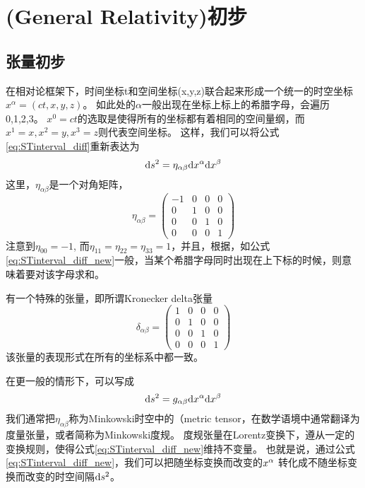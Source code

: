 \section{\GR (General Relativity)初步}
\subsection{张量初步}\label{sec:tensor}
在相对论框架下，时间坐标t和空间坐标(x,y,z)联合起来形成一个统一的时空坐标
$x^{\alpha} = (ct,x,y,z)$。
如此处的$\alpha$一般出现在坐标上标上的希腊字母，会遍历{0,1,2,3}。
$x^0= ct$的选取是使得所有的坐标都有着相同的空间量纲，而$x^1 =x, x^2 = y, x^3 = z$则代表空间坐标。
这样，我们可以将公式\ref{eq:STinterval_diff}重新表达为
\begin{equation}\label{eq:STinterval_diff_new}
  {\rm d}s^2 = \eta_ {\alpha \beta}{\rm d}x^\alpha {\rm d} x^\beta
\end{equation}
这里，$\eta_ {\alpha \beta}$是一个对角矩阵，
\begin{equation}\label{eq:Minkowski}
  \eta_{\alpha\beta} ={\begin{pmatrix}
                       -1 & 0 & 0 & 0\\
                        0 & 1 & 0 & 0\\ 
                        0 & 0 & 1 & 0\\
                        0 & 0 & 0 & 1\end{pmatrix}}
\end{equation}
注意到$\eta_{00} = -1$, 而$\eta_{11} = \eta_{22} = \eta_{33} = 1$，并且，根据{}，如公式\ref{eq:STinterval_diff_new}一般，当某个希腊字母同时出现在上下标的时候，则意味着要对该字母求和。


\begin{myprop}{}{}
  有一个特殊的张量，即所谓Kronecker delta张量
\begin{equation}\label{eq:Kronecker}
  \delta_{\alpha\beta} ={\begin{pmatrix}
                        1 & 0 & 0 & 0\\
                        0 & 1 & 0 & 0\\ 
                        0 & 0 & 1 & 0\\
                        0 & 0 & 0 & 1\end{pmatrix}}
\end{equation}
  该张量的表现形式在所有的坐标系中都一致。
\end{myprop}

在更一般的情形下，可以写成
\begin{equation}\label{eq:metric}
  {\rm d}s^2 = g_{\alpha \beta}{\rm d}x^\alpha {\rm d} x^\beta
\end{equation}
我们通常把$\eta_ {\alpha \beta}$称为Minkowski时空中的{}（metric tensor，在数学语境中通常翻译为度量张量，或者简称为Minkowski度规。
度规张量在Lorentz变换下，遵从一定的变换规则，使得公式\ref{eq:STinterval_diff_new}维持不变量。
也就是说，通过公式\ref{eq:STinterval_diff_new}，我们可以把随坐标变换而改变的${\rm }x^{\alpha} $ 转化成不随坐标变换而改变的时空间隔${\rm d} s^2$。

